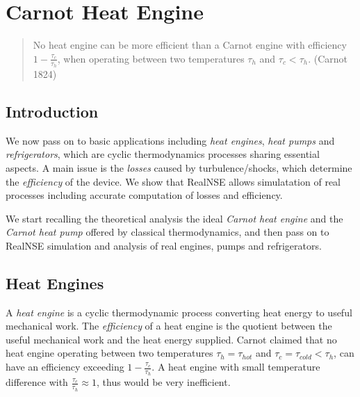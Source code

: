 \iffalse  %
\chapter{Carnot Heat Engine}

\small
\begin{quote}
No heat engine can be more efficient than a 
Carnot engine with efficiency
$1-\frac{\tau_c}{\tau_h}$, when operating between two temperatures 
$\tau_h$ and $\tau_c<\tau_h$.
(Carnot 1824)
\end{quote}
\normalsize


\section{Introduction}

We now pass on to basic applications including \emph{heat engines}, \emph{heat pumps} and \emph{refrigerators}, which are cyclic thermodynamics processes 
sharing essential aspects.  A main issue is the 
\emph{losses} caused by turbulence/shocks, which determine
the \emph{efficiency} of the device. We show that RealNSE
allows simulatation of real processes including
accurate computation of losses and efficiency.


We start recalling the theoretical analysis the ideal \emph{Carnot heat engine}
and the \emph{Carnot heat pump} offered by classical 
thermodynamics, and then pass on to RealNSE simulation and analysis
of real engines, pumps and refrigerators. 


\section{Heat Engines}


A \emph{heat engine} is a cyclic thermodynamic process converting
heat energy to useful mechanical work. The \emph{efficiency}
of a heat engine is the quotient between the useful mechanical work
and the heat energy supplied. 
Carnot claimed that no heat engine operating between
two temperatures $\tau_h=\tau_{hot}$ and $\tau_c=\tau_{cold}<\tau_h$, can have an efficiency
exceeding $1-\frac{\tau_c}{\tau_h}$. A heat engine
with small temperature difference with $\frac{\tau_c}{\tau_h}\approx 1$, thus would be very inefficient.

